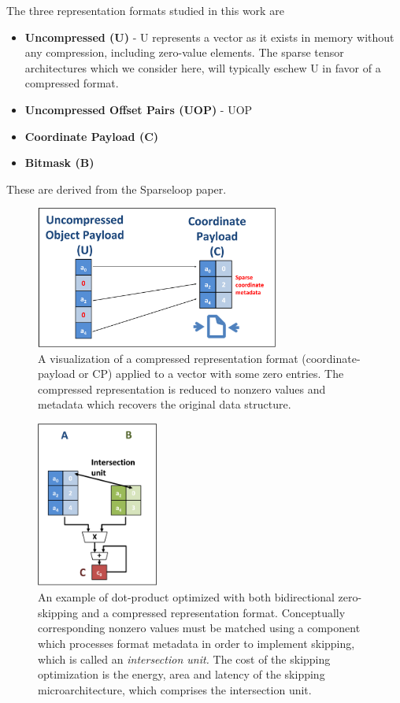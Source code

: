 The three representation formats studied in this work are

\begin{itemize}
    \item \textbf{Uncompressed (U)} - U represents a vector as it exists in memory without any compression, including zero-value elements. The sparse tensor architectures which we consider here, will typically eschew U in favor of a compressed format.
    \item \textbf{Uncompressed Offset Pairs (UOP)} - UOP 
    \item \textbf{Coordinate Payload (C)}
    \item \textbf{Bitmask (B)}
\end{itemize}

These are derived from the Sparseloop\cite{sparseloop} paper.

%
%
\begin{figure}[H]
\includegraphics[width=8cm]{figures/saf_format_optimizations.PNG}
\caption{A visualization of a compressed representation format (coordinate-payload or CP) applied to a vector with some zero entries. The compressed representation is reduced to nonzero values and metadata which recovers the original data structure.}
\label{fig:saf_format_optimizations}
\end{figure}
%
%

%
%
\begin{figure}[H]
\includegraphics[width=4cm]{figures/saf_action_format_combo.PNG}
\caption{An example of dot-product optimized with both bidirectional zero-skipping and a compressed representation format. Conceptually corresponding nonzero values must be matched using a component which processes format metadata in order to implement skipping, which is called an \textit{intersection unit.} The cost of the skipping optimization is the energy, area and latency of the skipping microarchitecture, which comprises the intersection unit.}
\label{fig:saf_action_format_combo}
\centering
\end{figure}

